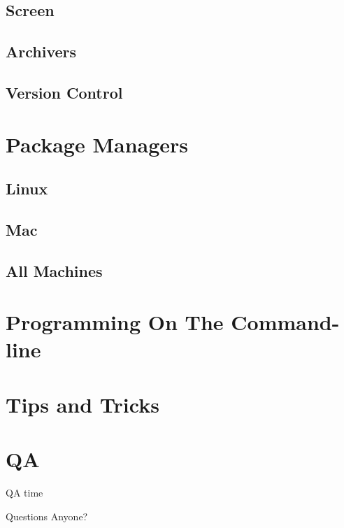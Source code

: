 \documentclass[10pt]{beamer}
\begin{document}
\subsection{Screen}

\subsection{Archivers}

\subsection{Version Control}

\section{Package Managers}

\subsection{Linux}

\subsection{Mac}

\subsection{All Machines}

\section{Programming On The Command-line}

\section{Tips and Tricks}

\section{QA}
\begin{frame}{QA time}
  \begin{center}
    Questions Anyone?
  \end{center}
\end{frame}
\end{document}
